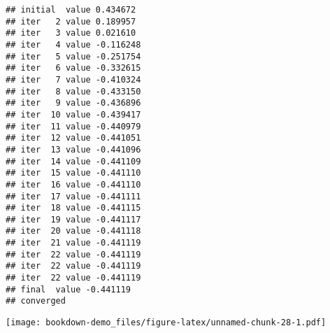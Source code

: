 \documentclass[
]{book}
\newenvironment{Shaded}{\begin{snugshade}}{\end{snugshade}}
\newcommand{\AttributeTok}[1]{\textcolor[rgb]{0.77,0.63,0.00}{#1}}
\newcommand{\DecValTok}[1]{\textcolor[rgb]{0.00,0.00,0.81}{#1}}
\newcommand{\FunctionTok}[1]{\textcolor[rgb]{0.00,0.00,0.00}{#1}}
\newcommand{\NormalTok}[1]{#1}
\newcommand{\OtherTok}[1]{\textcolor[rgb]{0.56,0.35,0.01}{#1}}
\newcommand{\SpecialCharTok}[1]{\textcolor[rgb]{0.00,0.00,0.00}{#1}}
\newcommand{\StringTok}[1]{\textcolor[rgb]{0.31,0.60,0.02}{#1}}
\begin{document}
\begin{Shaded}
\end{Shaded}

\begin{verbatim}
## initial  value 0.434672 
## iter   2 value 0.189957
## iter   3 value 0.021610
## iter   4 value -0.116248
## iter   5 value -0.251754
## iter   6 value -0.332615
## iter   7 value -0.410324
## iter   8 value -0.433150
## iter   9 value -0.436896
## iter  10 value -0.439417
## iter  11 value -0.440979
## iter  12 value -0.441051
## iter  13 value -0.441096
## iter  14 value -0.441109
## iter  15 value -0.441110
## iter  16 value -0.441110
## iter  17 value -0.441111
## iter  18 value -0.441115
## iter  19 value -0.441117
## iter  20 value -0.441118
## iter  21 value -0.441119
## iter  22 value -0.441119
## iter  22 value -0.441119
## iter  22 value -0.441119
## final  value -0.441119 
## converged
\end{verbatim}

\texttt{[image: bookdown-demo\_files/figure-latex/unnamed-chunk-28-1.pdf]}

\begin{Shaded}
\end{Shaded}
\end{document}
